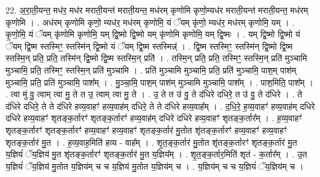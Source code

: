\documentclass[17pt]{extarticle}
\begin{document}
22. अ॒रा॒ती॒यन्त॒ मध॑र॒ मध॑र मराती॒यन्त॑ मराती॒यन्त॒ मध॑रम् कृणोमि कृणो॒म्यध॑र मराती॒यन्त॑ मराती॒यन्त॒ मध॑रम् कृणोमि । . अध॑रम् कृणोमि कृणो॒ म्यध॑र॒ मध॑रम् कृणोमि॒ यं ॅयम् कृ॑णो॒ म्यध॑र॒ मध॑रम् कृणोमि॒ यम् । . कृ॒णो॒मि॒ यं ॅयम् कृ॑णोमि कृणोमि॒ यम् द्वि॒ष्मो द्वि॒ष्मो यम् कृ॑णोमि कृणोमि॒ यम् द्वि॒ष्मः । . यम् द्वि॒ष्मो द्वि॒ष्मो यं ॅयम् द्वि॒ष्म स्तस्मिꣳ॒॒ स्तस्मि॑न् द्वि॒ष्मो यं ॅयम् द्वि॒ष्म स्तस्मिन्न्॑ । . द्वि॒ष्म स्तस्मिꣳ॒॒ स्तस्मि॑न् द्वि॒ष्मो द्वि॒ष्म स्तस्मि॒न् प्रति॒ प्रति॒ तस्मि॑न् द्वि॒ष्मो द्वि॒ष्म स्तस्मि॒न् प्रति॑ । . तस्मि॒न् प्रति॒ प्रति॒ तस्मिꣳ॒॒ स्तस्मि॒न् प्रति॑ मुञ्चामि मुञ्चामि॒ प्रति॒ तस्मिꣳ॒॒ स्तस्मि॒न् प्रति॑ मुञ्चामि । . प्रति॑ मुञ्चामि मुञ्चामि॒ प्रति॒ प्रति॑ मुञ्चामि॒ पाश॒म् पाश॑म् मुञ्चामि॒ प्रति॒ प्रति॑ मुञ्चामि॒ पाश᳚म् । . मु॒ञ्चा॒मि॒ पाश॒म् पाश॑म् मुञ्चामि मुञ्चामि॒ पाश᳚म् । . पाश॒मिति॒ पाश᳚म् । . त्वा मु॑ वु॒ त्वाम् त्वा मु॒ ते त उ॒ त्वाम् त्वा मु॒ ते । . उ॒ ते त उ॑ वु॒ ते द॑धिरे दधिरे॒ त उ॑ वु॒ ते द॑धिरे । . ते द॑धिरे दधिरे॒ ते ते द॑धिरे हव्य॒वाहꣳ॑ हव्य॒वाह॑म् दधिरे॒ ते ते द॑धिरे हव्य॒वाह᳚म् । . द॒धि॒रे॒ ह॒व्य॒वाहꣳ॑ हव्य॒वाह॑म् दधिरे दधिरे हव्य॒वाहꣳ॑ शृतङ्क॒र्तारꣳ॑ शृतङ्क॒र्तारꣳ॑ हव्य॒वाह॑म् दधिरे दधिरे हव्य॒वाहꣳ॑ शृतङ्क॒र्तार᳚म् । . ह॒व्य॒वाहꣳ॑ शृतङ्क॒र्तारꣳ॑ शृतङ्क॒र्तारꣳ॑ हव्य॒वाहꣳ॑ हव्य॒वाहꣳ॑ शृतङ्क॒र्तार॑ मु॒तोत शृ॑तङ्क॒र्तारꣳ॑ हव्य॒वाहꣳ॑ हव्य॒वाहꣳ॑ शृतङ्क॒र्तार॑ मु॒त । . ह॒व्य॒वाह॒मिति॑ हव्य - वाह᳚म् । . शृ॒त॒ङ्क॒र्तार॑ मु॒तोत शृ॑तङ्क॒र्तारꣳ॑ शृतङ्क॒र्तार॑ मु॒त य॒ज्ञियं॑ ॅय॒ज्ञिय॑ मु॒त शृ॑तङ्क॒र्तारꣳ॑ शृतङ्क॒र्तार॑ मु॒त य॒ज्ञिय᳚म् । . शृ॒त॒ङ्क॒र्तार॒मिति॑ शृतं - क॒र्तार᳚म् । . उ॒त य॒ज्ञियं॑ ॅय॒ज्ञिय॑ मु॒तोत य॒ज्ञिय॑म् च च य॒ज्ञिय॑ मु॒तोत य॒ज्ञिय॑म् च । . य॒ज्ञिय॑म् च च य॒ज्ञियं॑ ॅय॒ज्ञिय॑म् च । \newline
\end{document}
